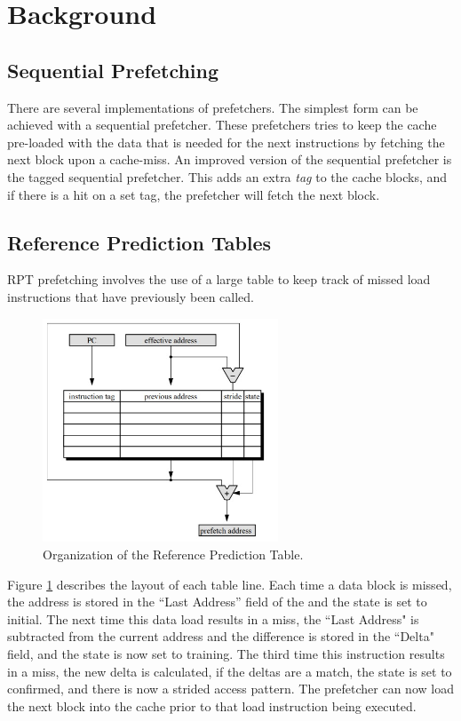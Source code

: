 \newline
\section{Background}\label{sec:background}
\subsection{Sequential Prefetching}
There are several implementations of prefetchers. The simplest form can be achieved with a sequential prefetcher\cite{prefetching}. These prefetchers tries to keep the cache pre-loaded with the data that is needed for the next instructions by fetching the next block upon a cache-miss. An improved version of the sequential prefetcher is the tagged sequential prefetcher. This adds an extra \emph{tag} to the cache blocks, and if there is a hit on a set tag, the prefetcher will fetch the next block.

\subsection{Reference Prediction Tables}
RPT prefetching involves the use of a large table to keep track of missed load instructions that have previously been called. 
\begin{figure}[!htb]
    \centering
    \includegraphics[width = 7cm]{images/RPTable.jpg}
    \caption{Organization of the Reference Prediction Table\cite{RPTimage}.}
    \label{fig:RPT Layout}
\end{figure}
Figure \ref{fig:RPT Layout} describes the layout of each table line. Each time a data block is missed, the address is stored in the ``Last Address'' field of the and the state is set to initial. The next time this data load results in a miss, the ``Last Address" is subtracted from the current address and the difference is stored in the ``Delta" field, and the state is now set to training. The third time this instruction results in a miss, the new delta is calculated, if the deltas are a match, the state is set to confirmed, and there is now a strided access pattern. The prefetcher can now load the next block into the cache prior to that load instruction being executed. 


